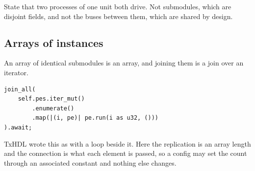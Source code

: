 \begin{rulebox}
State that two processes of one unit both drive. Not submodules, which are
disjoint fields, and not the buses between them, which are shared by
design.
\end{rulebox}

\subsection{Arrays of instances}

An array of identical submodules is an array, and joining them is a join
over an iterator.

\begin{lstlisting}[caption={An instance array. The replication count is a Rust array length, so a config can set it.},label={lst:hier-array}]
join_all(
    self.pes.iter_mut()
        .enumerate()
        .map(|(i, pe)| pe.run(i as u32, ()))
).await;
\end{lstlisting}

TxHDL wrote this as  with a  loop
beside it. Here the replication is an array length and the connection is
what each element is passed, so a config may set the count through an
associated constant and nothing else changes.
